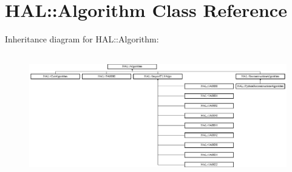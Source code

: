 \hypertarget{class_h_a_l_1_1_algorithm}{\section{H\-A\-L\-:\-:Algorithm Class Reference}
\label{class_h_a_l_1_1_algorithm}
}
Inheritance diagram for H\-A\-L\-:\-:Algorithm\-:\begin{figure}[H]
\begin{center}
\leavevmode
\includegraphics[height=5.427313cm]{class_h_a_l_1_1_algorithm}
\end{center}
\end{figure}
